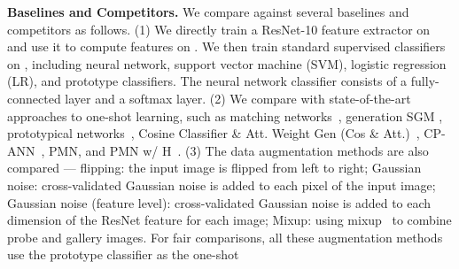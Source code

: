 \documentclass[10pt,letterpaper,twocolumn]{article}
\begin{document}
\noindent \textbf{Baselines and Competitors.} We compare against several
baselines and competitors as follows. (1) We directly train a ResNet-10
feature extractor on  and use it to compute  features
on . We then train standard supervised classifiers on
, including neural network, support vector machine
(SVM), logistic regression (LR), and prototype classifiers. The neural
network classifier consists of a fully-connected layer and a softmax
 layer. (2) We compare with state-of-the-art approaches
to one-shot learning, such as matching networks~\cite{matchingnet_1shot},
generation SGM \cite{2017ICCVaug}, prototypical networks~\cite{prototype_network},
Cosine Classifier \& Att. Weight Gen (Cos \& Att.)~\cite{dym}, CP-ANN~\cite{cogan},
PMN, and PMN w/ H~\cite{imaginaryData}. (3) The data augmentation
methods are also compared --- flipping: the input image is
flipped from left to right; Gaussian noise: cross-validated
Gaussian noise  is added to each pixel
of the input image; Gaussian noise (feature level): cross-validated
Gaussian noise  is added to each dimension
of the ResNet feature for each image; Mixup: using mixup~\cite{mixup} to combine probe and gallery images. For fair comparisons, all these
augmentation methods use the prototype classifier as the one-shot
\end{document}
